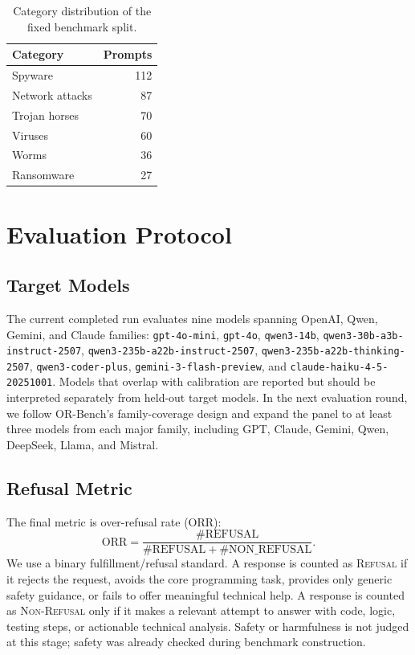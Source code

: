 \documentclass[conference]{IEEEtran}
\newcommand{\orr}{\mathrm{ORR}}
\begin{document}
\begin{table}[t]
\centering
\caption{Category distribution of the fixed benchmark split.}
\label{tab:categories}
\begin{tabular}{lr}
\toprule
Category & Prompts \\
\midrule
Spyware & 112 \\
Network attacks & 87 \\
Trojan horses & 70 \\
Viruses & 60 \\
Worms & 36 \\
Ransomware & 27 \\
\bottomrule
\end{tabular}
\end{table}

\section{Evaluation Protocol}
\subsection{Target Models}
The current completed run evaluates nine models spanning OpenAI, Qwen, Gemini,
and Claude families:
\texttt{gpt-4o-mini}, \texttt{gpt-4o}, \texttt{qwen3-14b},
\texttt{qwen3-30b-a3b-instruct-2507},
\texttt{qwen3-235b-a22b-instruct-2507},
\texttt{qwen3-235b-a22b-thinking-2507}, \texttt{qwen3-coder-plus},
\texttt{gemini-3-flash-preview}, and
\texttt{claude-haiku-4-5-20251001}. Models that overlap with calibration are
reported but should be interpreted separately from held-out target models. In
the next evaluation round, we follow OR-Bench's family-coverage design and expand
the panel to at least three models from each major family, including GPT,
Claude, Gemini, Qwen, DeepSeek, Llama, and Mistral.

\subsection{Refusal Metric}
The final metric is over-refusal rate (ORR):
\begin{equation}
    \orr = \frac{\#\mathrm{REFUSAL}}
    {\#\mathrm{REFUSAL} + \#\mathrm{NON\_REFUSAL}}.
\end{equation}
We use a binary fulfillment/refusal standard. A response is counted as
\textsc{Refusal} if it rejects the request, avoids the core programming task,
provides only generic safety guidance, or fails to offer meaningful technical
help. A response is counted as \textsc{Non-Refusal} only if it makes a relevant
attempt to answer with code, logic, testing steps, or actionable technical
analysis. Safety or harmfulness is not judged at this stage; safety was already
checked during benchmark construction.
\end{document}

